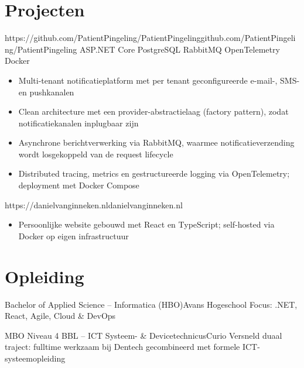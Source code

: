 \documentclass[a4paper,10pt]{article}
\begin{document}
\section{Projecten}

\begin{cvgrid}
          {https://github.com/PatientPingeling/PatientPingeling}{github.com/PatientPingeling/PatientPingeling}
          {ASP.NET Core \middot PostgreSQL \middot RabbitMQ \middot OpenTelemetry \middot Docker}
\begin{itemize}
  \item Multi-tenant notificatieplatform met per tenant geconfigureerde e-mail-, SMS- en pushkanalen
  \item Clean architecture met een provider-abstractielaag (factory pattern), zodat notificatiekanalen inplugbaar zijn
  \item Asynchrone berichtverwerking via RabbitMQ, waarmee notificatieverzending wordt losgekoppeld van de request lifecycle
  \item Distributed tracing, metrics en gestructureerde logging via OpenTelemetry; deployment met Docker Compose
\end{itemize}

          {https://danielvanginneken.nl}{danielvanginneken.nl}
          {}
\begin{itemize}
  \item Persoonlijke website gebouwd met React en TypeScript; self-hosted via Docker op eigen infrastructuur
\end{itemize}
\end{cvgrid}

\section{Opleiding}

\begin{cvgrid}
        {Bachelor of Applied Science -- Informatica (HBO)}{Avans Hogeschool}
{\small\color{muted}Focus: .NET, React, Agile, Cloud \& DevOps}

        {MBO Niveau 4 BBL -- ICT Systeem- \& Devicetechnicus}{Curio}
{\small\color{muted}Versneld duaal traject: fulltime werkzaam bij Dentech gecombineerd met formele ICT-systeemopleiding}
\end{cvgrid}
\end{document}
